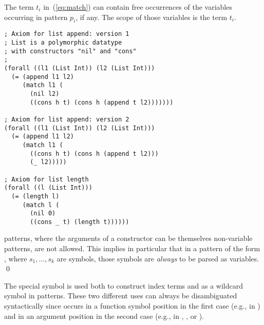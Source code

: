 
The term $t_i$ in~(\ref{eq:match}) can contain free occurrences 
of the variables occurring in pattern $p_i$, if any.
The scope of those variables is the term $t_i$.

\begin{lstlisting}[linewidth=29em]
; Axiom for list append: version 1
; List is a polymorphic datatype 
; with constructors "nil" and "cons"
;
(forall ((l1 (List Int)) (l2 (List Int)))
  (= (append l1 l2)
     (match l1 (
       (nil l2)
       ((cons h t) (cons h (append t l2)))))))

; Axiom for list append: version 2
(forall ((l1 (List Int)) (l2 (List Int)))
  (= (append l1 l2)
     (match l1 (
       ((cons h t) (cons h (append t l2)))
       (_ l2)))))

; Axiom for list length
(forall ((l (List Int)))
  (= (length l)
     (match l (
       (nil 0)
       ((cons _ t) (length t))))))
\end{lstlisting}

\begin{remark}
 patterns, where the arguments of a constructor can be themselves
non-variable patterns, are not allowed.
This implies in particular that in a pattern of the form ,
where $s_1, \ldots, s_k$ are symbols, those symbols are \emph{always} to be parsed as variables.
\qed
\end{remark}

\begin{newver}
\begin{remark}
The special symbol \ter{\_} is used both to construct index terms 
and as a wildcard symbol in  patterns.
These two different uses can always be disambiguated syntactically
since \ter{\_} occurs in a function symbol position in the first case 
(e.g., in )
and in an argument position in the second case
(e.g., in , , or ).
\end{remark}
\end{newver}


